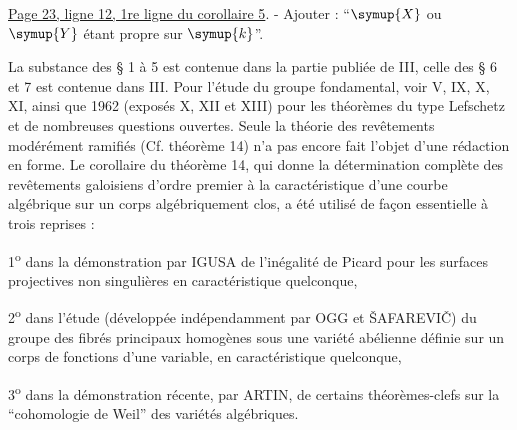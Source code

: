 \noindent\uline{Page 23, ligne 12, 1re ligne du corollaire
5}. - Ajouter : ``$\symup{X}$ ou $\symup{Y}$ étant propre sur $\symup{k}$''.

La substance des § 1 à 5 est contenue dans la partie publiée de  III,
celle des § 6 et 7 est contenue dans  III. Pour l'étude du groupe
fondamental, voir  V, IX, X, XI, ainsi que  1962 (exposés X, XII et XIII)
pour les théorèmes du type Lefschetz et de nombreuses questions ouvertes.
Seule la théorie des revêtements modérément ramifiés (Cf. théorème 14) n'a pas
encore fait l'objet d'une rédaction en forme. Le corollaire du théorème 14, qui
donne la détermination complète des revêtements galoisiens d'ordre premier à la
caractéristique d'une courbe algébrique sur un corps algébriquement clos, a été
utilisé de façon essentielle à trois reprises :

1\textsuperscript{o} dans la démonstration par IGUSA de l'inégalité de Picard
pour les surfaces projectives non singulières en caractéristique quelconque,

2\textsuperscript{o} dans l'étude (développée indépendamment par OGG et
ŠAFAREVIČ) du groupe des fibrés principaux homogènes sous une variété abélienne
définie sur un corps de fonctions d'une variable, en caractéristique
quelconque,

3\textsuperscript{o} dans la démonstration récente, par ARTIN, de certains
théorèmes-clefs sur la ``cohomologie de Weil'' des variétés algébriques.
\endgroup
